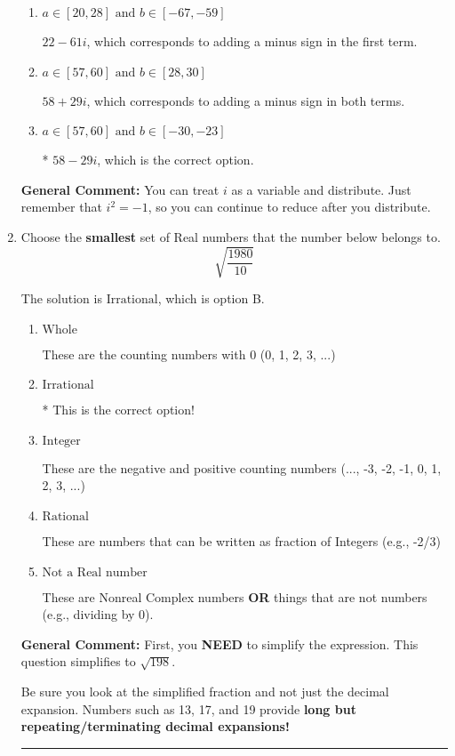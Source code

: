\documentclass{extbook}[14pt]
\newcommand{\litem}[1]{\item #1

\rule{\textwidth}{0.4pt}}
\begin{document}
\begin{enumerate}
{\begin{enumerate}[label=\Alph*.]
 $40 - 18 i$, which corresponds to just multiplying the real terms to get the real part of the solution and the coefficients in the complex terms to get the complex part.
\item \( a \in [20, 28] \text{ and } b \in [-67, -59] \)

 $22 - 61 i$, which corresponds to adding a minus sign in the first term.
\item \( a \in [57, 60] \text{ and } b \in [28, 30] \)

 $58 + 29 i$, which corresponds to adding a minus sign in both terms.
\item \( a \in [57, 60] \text{ and } b \in [-30, -23] \)

* $58 - 29 i$, which is the correct option.
\end{enumerate}

\textbf{General Comment:} You can treat $i$ as a variable and distribute. Just remember that $i^2=-1$, so you can continue to reduce after you distribute.
}
\litem{
Choose the \textbf{smallest} set of Real numbers that the number below belongs to.
\[ \sqrt{\frac{1980}{10}} \]

The solution is \( \text{Irrational} \), which is option B.\begin{enumerate}[label=\Alph*.]
\item \( \text{Whole} \)

These are the counting numbers with 0 (0, 1, 2, 3, ...)
\item \( \text{Irrational} \)

* This is the correct option!
\item \( \text{Integer} \)

These are the negative and positive counting numbers (..., -3, -2, -1, 0, 1, 2, 3, ...)
\item \( \text{Rational} \)

These are numbers that can be written as fraction of Integers (e.g., -2/3)
\item \( \text{Not a Real number} \)

These are Nonreal Complex numbers \textbf{OR} things that are not numbers (e.g., dividing by 0).
\end{enumerate}

\textbf{General Comment:} First, you \textbf{NEED} to simplify the expression. This question simplifies to $\sqrt{198}$. 
 
 Be sure you look at the simplified fraction and not just the decimal expansion. Numbers such as 13, 17, and 19 provide \textbf{long but repeating/terminating decimal expansions!} 
 
}
\end{enumerate}
\end{document}
